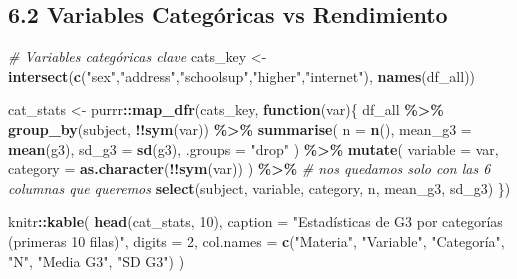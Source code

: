 \documentclass[
]{book}
\newenvironment{Shaded}{\begin{snugshade}}{\end{snugshade}}
\newcommand{\AttributeTok}[1]{\textcolor[rgb]{0.13,0.29,0.53}{#1}}
\newcommand{\CommentTok}[1]{\textcolor[rgb]{0.56,0.35,0.01}{\textit{#1}}}
\newcommand{\ControlFlowTok}[1]{\textcolor[rgb]{0.13,0.29,0.53}{\textbf{#1}}}
\newcommand{\DecValTok}[1]{\textcolor[rgb]{0.00,0.00,0.81}{#1}}
\newcommand{\FunctionTok}[1]{\textcolor[rgb]{0.13,0.29,0.53}{\textbf{#1}}}
\newcommand{\NormalTok}[1]{#1}
\newcommand{\OtherTok}[1]{\textcolor[rgb]{0.56,0.35,0.01}{#1}}
\newcommand{\SpecialCharTok}[1]{\textcolor[rgb]{0.81,0.36,0.00}{\textbf{#1}}}
\newcommand{\StringTok}[1]{\textcolor[rgb]{0.31,0.60,0.02}{#1}}
\begin{document}
\subsection{6.2 Variables Categóricas vs Rendimiento}\label{variables-categuxf3ricas-vs-rendimiento}

\begin{Shaded}
\begin{Highlighting}[]
\CommentTok{\# Variables categóricas clave}
\NormalTok{cats\_key }\OtherTok{\textless{}{-}} \FunctionTok{intersect}\NormalTok{(}\FunctionTok{c}\NormalTok{(}\StringTok{"sex"}\NormalTok{,}\StringTok{"address"}\NormalTok{,}\StringTok{"schoolsup"}\NormalTok{,}\StringTok{"higher"}\NormalTok{,}\StringTok{"internet"}\NormalTok{), }\FunctionTok{names}\NormalTok{(df\_all))}

\NormalTok{cat\_stats }\OtherTok{\textless{}{-}}\NormalTok{ purrr}\SpecialCharTok{::}\FunctionTok{map\_dfr}\NormalTok{(cats\_key, }\ControlFlowTok{function}\NormalTok{(var)\{}
\NormalTok{  df\_all }\SpecialCharTok{\%\textgreater{}\%}
    \FunctionTok{group\_by}\NormalTok{(subject, }\SpecialCharTok{!!}\FunctionTok{sym}\NormalTok{(var)) }\SpecialCharTok{\%\textgreater{}\%}
    \FunctionTok{summarise}\NormalTok{(}
      \AttributeTok{n =} \FunctionTok{n}\NormalTok{(),}
      \AttributeTok{mean\_g3 =} \FunctionTok{mean}\NormalTok{(g3),}
      \AttributeTok{sd\_g3 =} \FunctionTok{sd}\NormalTok{(g3),}
      \AttributeTok{.groups =} \StringTok{"drop"}
\NormalTok{    ) }\SpecialCharTok{\%\textgreater{}\%}
    \FunctionTok{mutate}\NormalTok{(}
      \AttributeTok{variable =}\NormalTok{ var,}
      \AttributeTok{category =} \FunctionTok{as.character}\NormalTok{(}\SpecialCharTok{!!}\FunctionTok{sym}\NormalTok{(var))}
\NormalTok{    ) }\SpecialCharTok{\%\textgreater{}\%}
    \CommentTok{\# nos quedamos solo con las 6 columnas que queremos}
    \FunctionTok{select}\NormalTok{(subject, variable, category, n, mean\_g3, sd\_g3)}
\NormalTok{\})}

\NormalTok{knitr}\SpecialCharTok{::}\FunctionTok{kable}\NormalTok{(}
  \FunctionTok{head}\NormalTok{(cat\_stats, }\DecValTok{10}\NormalTok{),}
  \AttributeTok{caption =} \StringTok{"Estadísticas de G3 por categorías (primeras 10 filas)"}\NormalTok{,}
  \AttributeTok{digits =} \DecValTok{2}\NormalTok{,}
  \AttributeTok{col.names =} \FunctionTok{c}\NormalTok{(}\StringTok{"Materia"}\NormalTok{, }\StringTok{"Variable"}\NormalTok{, }\StringTok{"Categoría"}\NormalTok{, }\StringTok{"N"}\NormalTok{, }\StringTok{"Media G3"}\NormalTok{, }\StringTok{"SD G3"}\NormalTok{)}
\NormalTok{)}
\end{Highlighting}
\end{Shaded}
\end{document}
